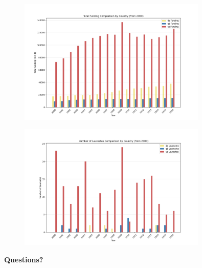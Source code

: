 \documentclass[aspectratio=169,xcolor=dvipsnames]{beamer}
\begin{document}
\begin{frame}
	\begin{figure}[H]
	\centering
	\includegraphics[width=0.8\textwidth]{../queries/plots/funding_comparison_by_country.png}
	\label{fig:fundings_per_country}
\end{figure}
\end{frame}

\begin{frame}
\begin{figure}[H]
	\centering
	\includegraphics[width=0.8\textwidth]{../queries/plots/laureates_comparison_by_country.png}
	\label{fig:laureates_per_country}
\end{figure}
\end{frame}

\begin{frame}
	\Huge{\centerline{\textbf{Questions?}}}
\end{frame}
\end{document}
